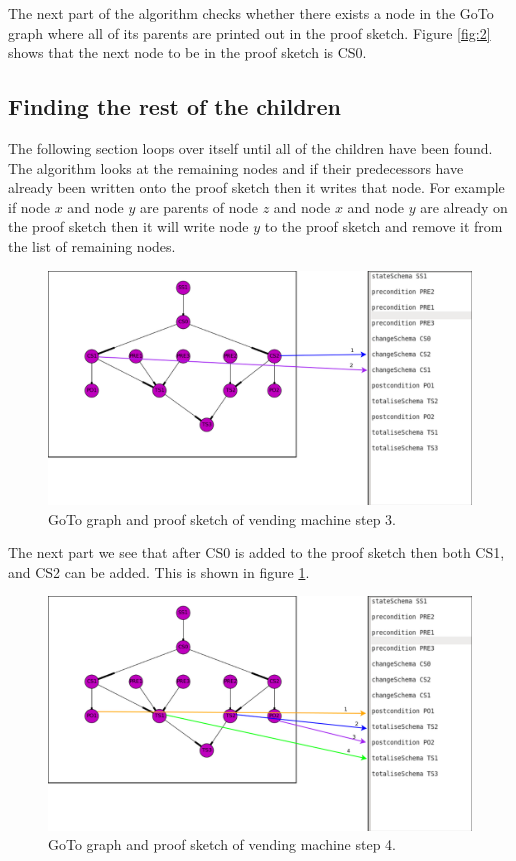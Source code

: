 The next part of the algorithm checks whether there exists a node in the GoTo
graph where all of its parents are printed out in the proof sketch. Figure
\ref{fig:2} shows that the next node to be in the proof sketch is CS0. 

\subsection{Finding the rest of the children}
The following section loops over itself until all of the children have been found.
The algorithm looks at the remaining nodes and if their predecessors have already 
been written onto the proof sketch then it writes that node.
For example if node $x$ and node $y$ are parents of node $z$ and node $x$ and node $y$
are already on the proof sketch then it will write node $y$ to the proof sketch and
remove it from the list of remaining nodes.

\begin{figure}[H]
\includegraphics[scale=0.3]{Figures/skeleton/3.png}
\caption{GoTo graph and proof sketch of vending machine step 3.}
\label{fig:3}
\end{figure}

The next part we see that after CS0 is added to the proof sketch then both
CS1, and CS2 can be added. This is shown in figure \ref{fig:3}.

\begin{figure}[H]
\includegraphics[scale=0.3]{Figures/skeleton/4.png}
\caption{GoTo graph and proof sketch of vending machine step 4.}
\label{fig:4}
\end{figure}

